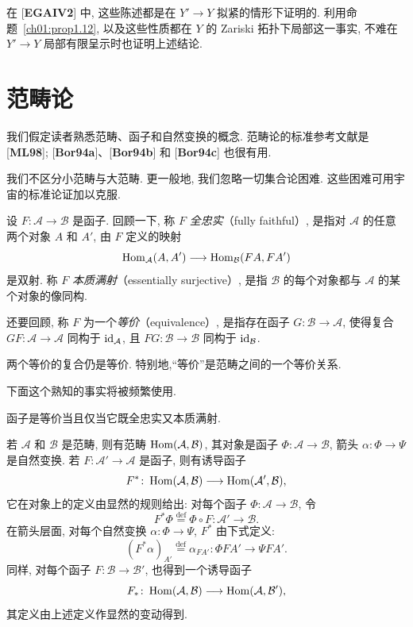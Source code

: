 在 [\textbf{EGAIV2}] 中, 这些陈述都是在 $Y'\to Y$ 拟紧的情形下证明的. 利用命题~\ref{ch01:prop1.12}, 以及这些性质都在 $Y$ 的 Zariski 拓扑下局部这一事实, 不难在 $Y'\to Y$ 局部有限呈示时也证明上述结论.

\section{范畴论}\label{ch01:sec2}
我们假定读者熟悉范畴、函子和自然变换的概念. 范畴论的标准参考文献是 [\textbf{ML98}]; [\textbf{Bor94a}]、[\textbf{Bor94b}] 和 [\textbf{Bor94c}] 也很有用.

我们不区分小范畴与大范畴. 更一般地, 我们忽略一切集合论困难. 这些困难可用宇宙的标准论证加以克服.

设 $F\colon\mathcal A\to\mathcal B$ 是函子. 回顾一下, 称 $F$ \emph{全忠实}（fully faithful）, 是指对 $\mathcal A$ 的任意两个对象 $A$ 和 $A'$, 由 $F$ 定义的映射
\[\operatorname{Hom}_{\mathcal A}(A,A')\longrightarrow\operatorname{Hom}_{\mathcal B}(FA,FA')\]
是双射. 称 $F$ \emph{本质满射}（essentially surjective）, 是指 $\mathcal B$ 的每个对象都与 $\mathcal A$ 的某个对象的像同构.

还要回顾, 称 $F$ 为一个\emph{等价}（equivalence）, 是指存在函子 $G\colon\mathcal B\to\mathcal A$, 使得复合 $GF\colon\mathcal A\to\mathcal A$ 同构于 $\mathrm{id}_{\mathcal A}$, 且 $FG\colon\mathcal B\to\mathcal B$ 同构于 $\mathrm{id}_{\mathcal B}$.

两个等价的复合仍是等价. 特别地,“等价”是范畴之间的一个等价关系.

下面这个熟知的事实将被频繁使用.

\begin{proposition}\label{ch01:prop1.16}
函子是等价当且仅当它既全忠实又本质满射.
\end{proposition}

若 $\mathcal A$ 和 $\mathcal B$ 是范畴, 则有范畴 $\operatorname{Hom}(\mathcal A,\mathcal B)$, 其对象是函子 $\Phi\colon\mathcal A\to\mathcal B$, 箭头 $\alpha\colon\Phi\to\Psi$ 是自然变换. 若 $F\colon\mathcal A'\to\mathcal A$ 是函子, 则有诱导函子
\[F^*\colon\operatorname{Hom}(\mathcal A,\mathcal B)\longrightarrow\operatorname{Hom}(\mathcal A',\mathcal B),\]
它在对象上的定义由显然的规则给出: 对每个函子 $\Phi\colon\mathcal A\to\mathcal B$, 令
\[F^*\Phi\overset{\mathrm{def}}=\Phi\circ F\colon\mathcal A'\longrightarrow\mathcal B.\]
在箭头层面, 对每个自然变换 $\alpha\colon\Phi\to\Psi$, $F^*$ 由下式定义:
\[(F^*\alpha)_{A'}\overset{\mathrm{def}}=\alpha_{FA'}\colon\Phi FA'\longrightarrow\Psi FA'.\]
同样, 对每个函子 $F\colon\mathcal B\to\mathcal B'$, 也得到一个诱导函子
\[F_*\colon\operatorname{Hom}(\mathcal A,\mathcal B)\longrightarrow\operatorname{Hom}(\mathcal A,\mathcal B'),\]
其定义由上述定义作显然的变动得到.

